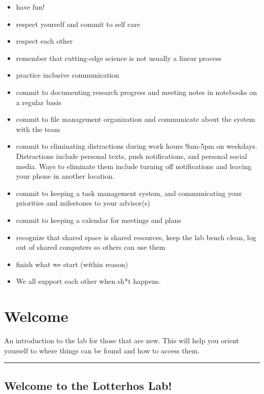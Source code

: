 \documentclass[
  letterpaper,
  DIV=11,
  numbers=noendperiod]{scrreprt}
\begin{document}
\begin{itemize}
\item
  have fun!
\item
  respect yourself and commit to self care
\item
  respect each other
\item
  remember that cutting-edge science is not usually a linear process
\item
  practice inclusive communication
\item
  commit to documenting research progress and meeting notes in notebooks
  on a regular basis
\item
  commit to file management organization and communicate about the
  system with the team
\item
  commit to eliminating distractions during work hours 9am-5pm on
  weekdays. Distractions include personal texts, push notifications, and
  personal social media. Ways to eliminate them include turning off
  notifications and leaving your phone in another location.
\item
  commit to keeping a task management system, and communicating your
  priorities and milestones to your advisor(s)
\item
  commit to keeping a calendar for meetings and plans
\item
  recognize that shared space is shared resources, keep the lab bench
  clean, log out of shared computers so others can use them
\item
  finish what we start (within reason)
\item
  We all support each other when sh*t happens.
\end{itemize}

\hypertarget{welcome}{%
\chapter{Welcome}\label{welcome}}

An introduction to the lab for those that are new. This will help you
orient yourself to where things can be found and how to access them.

\begin{center}\rule{0.5\linewidth}{0.5pt}\end{center}

\hypertarget{welcome-to-the-lotterhos-lab}{%
\section*{\texorpdfstring{\textbf{Welcome to the Lotterhos
Lab!}}{Welcome to the Lotterhos Lab!}}\label{welcome-to-the-lotterhos-lab}}
\end{document}
